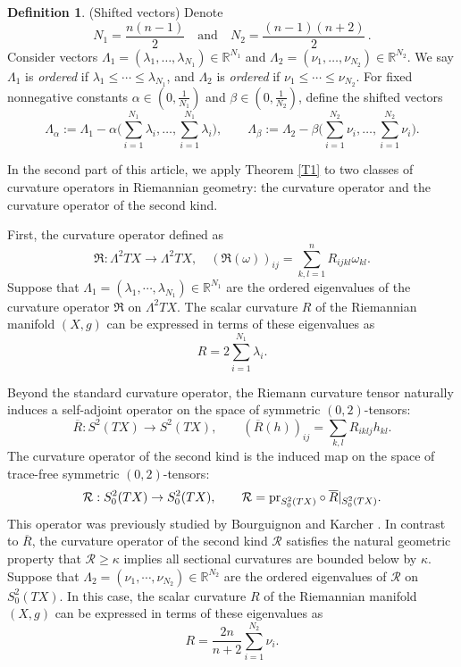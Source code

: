 \documentclass[12pt, twoside]{article}
\theoremstyle{definition}
\newtheorem{definition}[theorem]{Definition}
\numberwithin{equation}{section}
\begin{document}
\begin{definition}\label{shifted cone}(Shifted vectors) 
Denote
\begin{equation}\label{N12}
N_{1}=\frac{n(n-1)}{2} \quad \textrm{and} \quad N_{2}=\frac{(n-1)(n+2)}{2}\,.
\end{equation} 
Consider vectors $\Lambda_{1} = (\lambda_{1}, \dots, \lambda_{N_{1}})\in \mathbb{R}^{N_1}$ and   $\Lambda_{2} = (\nu_{1}, \dots, \nu_{N_{2}})\in \mathbb{R}^{N_2}$. We say $\Lambda_1$ is \textit{ordered} if $\lambda_1   \leq \cdots \leq \lambda_{N_1}$, and $\Lambda_2$ is \textit{ordered} if $\nu_1 \leq \cdots \leq \nu_{N_2}$. For fixed nonnegative constants $\alpha\in (0,\frac{1}{N_{1}})$ and $\beta\in (0,\frac{1}{N_{2}})$, define the shifted vectors
\begin{equation}
\Lambda_{\alpha} := \Lambda_{1} - \alpha \big(\sum_{i=1}^{N_{1}}\lambda_{i}, \dots, \sum_{i=1}^{N_{1}}\lambda_{i}\big), \qquad \Lambda_{\beta} := \Lambda_{2} - \beta \big(\sum_{i=1}^{N_{2}}\nu_{i}, \dots, \sum_{i=1}^{N_{2}}\nu_{i}\big).
\end{equation}
\end{definition}
 

In the second part of this article, we apply Theorem \ref{T1} to two classes of curvature operators in Riemannian geometry: the curvature operator and the curvature operator of the second kind.

First, the curvature operator defined as
$$\mathfrak{R}:\Lambda^{2}TX\rightarrow\Lambda^{2}TX,\quad (\mathfrak{R}(\omega))_{ij}=\sum_{k,l=1}^{n}R_{ijkl}\omega_{kl}.$$
Suppose that $\Lambda_{1}=(\lambda_{1},\cdots,\lambda_{N_1})\in \mathbb{R}^{N_1}$ are the  ordered  eigenvalues of the curvature operator $\mathfrak{R}$ on $\Lambda^{2}TX$. The scalar curvature $R$ of the Riemannian manifold $(X,g)$ can be expressed in terms of these eigenvalues as
\begin{equation}\label{R1}
R=2\sum_{i=1}^{N_1}\lambda_{i}.
\end{equation}

Beyond the standard curvature operator, the Riemann curvature tensor naturally induces a self-adjoint operator on the space of symmetric $(0,2)$-tensors:
$$\overline{R}:S^{2}(TX)\rightarrow S^{2}(TX), \qquad (\overline{R}(h))_{ij}=\sum_{k,l}R_{iklj}h_{kl}.$$
The curvature operator of the second kind is the induced map on the space of trace-free symmetric $(0,2)$-tensors:
$$\mathcal{R}:S_{0}^{2}(TX)\rightarrow S^{2}_{0}(TX), \qquad \mathcal{R}={\rm{pr}}_{S^{2}_{0}(TX)}\circ\overline{R}|_{S^{2}_{0}(TX)}.$$
This operator was previously studied by Bourguignon and Karcher \cite{BK78}. In contrast to $\overline{R}$, the curvature operator of the second kind $\mathcal{R}$ satisfies the natural geometric property that $\mathcal{R}\geq \kappa$ implies all sectional curvatures are bounded below by $\kappa$.
Suppose that $\Lambda_{2}=(\nu_{1},\cdots,\nu_{N_2})\in \mathbb{R}^{N_2}$ are the ordered eigenvalues of $\mathcal{R}$ on $S^{2}_{0}(TX)$. In this case, the scalar curvature $R$ of the Riemannian manifold $(X,g)$ can be expressed in terms of these eigenvalues as
\begin{equation}\label{R2}
R=\frac{2n}{n+2}\sum_{i=1}^{N_2}\nu_{i}.
\end{equation}
 
\end{document}
